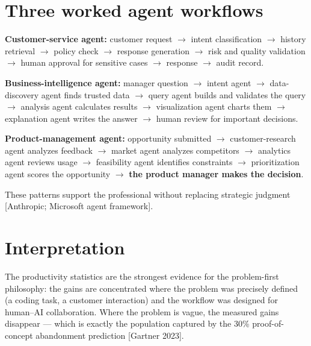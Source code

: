 \section{Three worked agent workflows}

\textbf{Customer-service agent:} customer request $\rightarrow$ intent
classification $\rightarrow$ history retrieval $\rightarrow$ policy check
$\rightarrow$ response generation $\rightarrow$ risk and quality validation
$\rightarrow$ human approval for sensitive cases $\rightarrow$ response
$\rightarrow$ audit record.

\textbf{Business-intelligence agent:} manager question $\rightarrow$ intent
agent $\rightarrow$ data-discovery agent finds trusted data $\rightarrow$
query agent builds and validates the query $\rightarrow$ analysis agent
calculates results $\rightarrow$ visualization agent charts them
$\rightarrow$ explanation agent writes the answer $\rightarrow$ human review
for important decisions.

\textbf{Product-management agent:} opportunity submitted $\rightarrow$
customer-research agent analyzes feedback $\rightarrow$ market agent analyzes
competitors $\rightarrow$ analytics agent reviews usage $\rightarrow$
feasibility agent identifies constraints $\rightarrow$ prioritization agent
scores the opportunity $\rightarrow$ \textbf{the product manager makes the
decision}.

These patterns support the professional without replacing strategic judgment
[Anthropic; Microsoft agent framework].

\section{Interpretation}

The productivity statistics are the strongest evidence for the problem-first
philosophy: the gains are concentrated where the problem was precisely defined
(a coding task, a customer interaction) and the workflow was designed for
human--AI collaboration. Where the problem is vague, the measured gains
disappear — which is exactly the population captured by the 30\% proof-of-
concept abandonment prediction [Gartner 2023].

